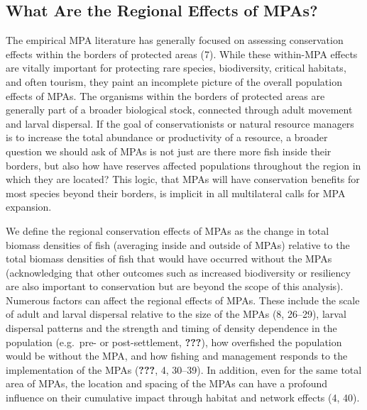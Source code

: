 \documentclass[9pt,twocolumn,twoside,lineno]{pnas-new}
\begin{document}
\hypertarget{what-are-the-regional-effects-of-mpas}{%
\subsection*{What Are the Regional Effects of
MPAs?}\label{what-are-the-regional-effects-of-mpas}}

The empirical MPA literature has generally focused on assessing
conservation effects within the borders of protected areas (7). While
these within-MPA effects are vitally important for protecting rare
species, biodiversity, critical habitats, and often tourism, they paint
an incomplete picture of the overall population effects of MPAs. The
organisms within the borders of protected areas are generally part of a
broader biological stock, connected through adult movement and larval
dispersal. If the goal of conservationists or natural resource managers
is to increase the total abundance or productivity of a resource, a
broader question we should ask of MPAs is not just are there more fish
inside their borders, but also how have reserves affected populations
throughout the region in which they are located? This logic, that MPAs
will have conservation benefits for most species beyond their borders,
is implicit in all multilateral calls for MPA expansion.

We define the regional conservation effects of MPAs as the change in
total biomass densities of fish (averaging inside and outside of MPAs)
relative to the total biomass densities of fish that would have occurred
without the MPAs (acknowledging that other outcomes such as increased
biodiversity or resiliency are also important to conservation but are
beyond the scope of this analysis). Numerous factors can affect the
regional effects of MPAs. These include the scale of adult and larval
dispersal relative to the size of the MPAs (8, 26--29), larval dispersal
patterns and the strength and timing of density dependence in the
population (e.g.~pre- or post-settlement, \textbf{???}), how overfished
the population would be without the MPA, and how fishing and management
responds to the implementation of the MPAs ({\textbf{???}}, 4, 30--39).
In addition, even for the same total area of MPAs, the location and
spacing of the MPAs can have a profound influence on their cumulative
impact through habitat and network effects (4, 40).
\end{document}

